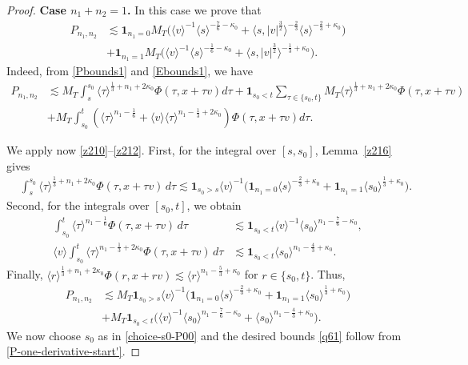 \documentclass[10pt,a4paper]{amsart}
\theoremstyle{plain}
\begin{document}
\begin{proof}
	
	
	{\bf{Case $n_1+n_2=1$.}} In this case we prove that
	\begin{align}\nonumber
		P_{n_1,n_2}&\lesssim \mathbf{1}_{n_1=0}M_T\big(\langle v\rangle^{-1}\langle s\rangle^{-\frac{7}{6}-\kappa_0}+\langle s,|v|^{\frac{3}{2}}\rangle^{-\frac{2}{3}} 	\langle s\rangle^{-\frac{2}{3}+\kappa_0}\big)
		\\&+\mathbf{1}_{n_1=1}M_T\big(\langle v\rangle^{-1}\langle s\rangle^{-\frac{1}{6}-\kappa_0}+\langle s,|v|^{\frac{3}{2}}\rangle^{-\frac{1}{3}+\kappa_0}\big).\label{q61}
	\end{align}	
	Indeed, from \eqref{Pbounds1} and \eqref{Ebounds1}, we have
	\begin{align}\nonumber
		P_{n_1,n_2}	&\lesssim M_T\int_s^{s_0} \langle \tau\rangle^{\frac{1}{3}+n_1+2\kappa_0} \Phi(\tau,x+\tau v)d\tau+\mathbf 1_{s_0<t}\sum_{\tau\in\{s_0,t\}}M_T \langle \tau\rangle^{\frac{1}{3}+n_1+2\kappa_0} \Phi(\tau,x+\tau v)\\&
		+M_T\int_{s_0}^{t}(\langle \tau\rangle^{n_1-\frac{1}{6}}+\langle v\rangle\langle \tau\rangle^{n_1-\frac{1}{3}+2\kappa_0})\Phi(\tau,x+\tau v)d\tau.	\label{P-one-derivative-start}
	\end{align}
	
	We apply now \eqref{z210}--\eqref{z212}. First, for the integral over $[s,s_0]$, Lemma~\ref{z216} gives
	\begin{align}
		&\int_s^{s_0}
		\langle \tau\rangle^{\frac13+n_1+2\kappa_0}
		\Phi(\tau,x+\tau v)\,d\tau\lesssim\mathbf 1_{s_0>s}\langle v\rangle^{-1}
		\big(\mathbf 1_{n_1=0}\langle s\rangle^{-\frac23+\kappa_0}+\mathbf 1_{n_1=1}\langle s_0\rangle^{\frac13+\kappa_0}\big)
		\label{q61-I0}.
	\end{align}
	Second, for the integrals over $[s_0,t]$, we obtain
	\begin{equation*}
		\begin{split}
			\int_{s_0}^{t}
			\langle \tau\rangle^{n_1-\frac16}
			\Phi(\tau,x+\tau v)\,d\tau
			&\lesssim\mathbf{1}_{s_0<t}\langle v\rangle^{-1}\langle s_0\rangle^{n_1-\frac76-\kappa_0},\\
			\langle v\rangle
			\int_{s_0}^{t}
			\langle \tau\rangle^{n_1-\frac13+2\kappa_0}
			\Phi(\tau,x+\tau v)\,d\tau
			&\lesssim\mathbf{1}_{s_0<t}\langle s_0\rangle^{n_1-\frac43+\kappa_0}.
		\end{split}
	\end{equation*}
	Finally, $\langle r\rangle^{\frac13+n_1+2\kappa_0}\Phi(r,x+rv)\lesssim\langle r\rangle^{n_1-\frac53+\kappa_0}$ for $r\in\{s_0,t\}$. Thus, 
	\begin{align}\nonumber
		P_{n_1,n_2}	&\lesssim M_T	\mathbf 1_{s_0>s}\langle v\rangle^{-1}\big(\mathbf 1_{n_1=0}
		\langle s\rangle^{-\frac23+\kappa_0}+\mathbf 1_{n_1=1}
		\langle s_0\rangle^{\frac13+\kappa_0}\big)\\&
		+M_T\mathbf{1}_{s_0<t}\big(\langle v\rangle^{-1}
		\langle s_0\rangle^{n_1-\frac76-\kappa_0}+	\langle s_0\rangle^{n_1-\frac43+\kappa_0}\big).	\label{P-one-derivative-start'}
	\end{align}
	We now choose  $s_0$ as in \eqref{choice-s0-P00} and the desired bounds \eqref{q61} follow from \eqref{P-one-derivative-start'}.
	

\end{proof}
\end{document}
